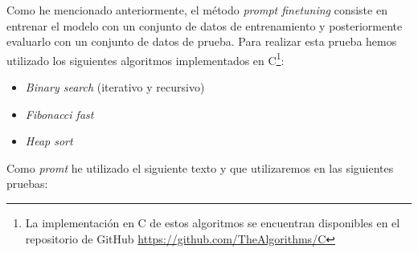 
Como he mencionado anteriormente, el método \textit{prompt finetuning} consiste en entrenar
el modelo con un conjunto de datos de entrenamiento y posteriormente evaluarlo con un conjunto
de datos de prueba. Para realizar esta prueba hemos utilizado los siguientes algoritmos implementados
en C\footnote{La implementación en C de estos algoritmos se encuentran disponibles en el repositorio de GitHub
\url{https://github.com/TheAlgorithms/C}}:

\begin{itemize}
    \item \textit{Binary search} (iterativo y recursivo)
    \item \textit{Fibonacci fast}
    \item \textit{Heap sort}
\end{itemize}

Como \textit{promt} he utilizado el siguiente texto y que utilizaremos en las siguientes
pruebas:

